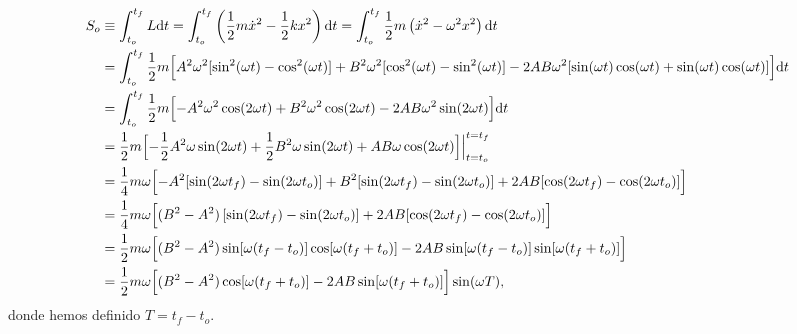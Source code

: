 \documentclass{article}
\begin{document}
\begin{align}
    S_o &\equiv \int_{t_o}^{t_f} L \mathrm{d}t = \int_{t_o}^{t_f} \left(\frac{1}{2}m\dot{x}^2 - \frac{1}{2}kx^2\right) \mathrm{d}t = \int_{t_o}^{t_f} \frac{1}{2}m\left(\dot{x}^2 - \omega^2 x^2\right) \mathrm{d}t \nonumber \\
    &= \int_{t_o}^{t_f} \frac{1}{2}m \Bigl[A^2\omega^2[\sin^2(\omega t)-\cos^2(\omega t)] + B^2\omega^2[\cos^2(\omega t)-\sin^2(\omega t)] - 2AB\omega^2[\sin(\omega t)\cos(\omega t)+\sin(\omega t)\cos(\omega t)]\Bigr] \mathrm{d}t \nonumber \\
    &= \int_{t_o}^{t_f} \frac{1}{2}m \Bigl[-A^2\omega^2\cos(2\omega t) + B^2\omega^2\cos(2\omega t) - 2AB\omega^2\sin(2\omega t)\Bigr] \mathrm{d}t \nonumber \\
    &= \frac{1}{2}m \Bigl[-\frac{1}{2}A^2\omega\sin(2\omega t) + \frac{1}{2}B^2\omega\sin(2\omega t) + AB\omega\cos(2\omega t)\Bigr] \Bigr|_{t=t_o}^{t=t_f} \nonumber \\
    &= \frac{1}{4}m\omega \Bigl[-A^2[\sin(2\omega t_f)-\sin(2\omega t_o)] + B^2[\sin(2\omega t_f)-\sin(2\omega t_o)] + 2AB[\cos(2\omega t_f)-\cos(2\omega t_o)]\Bigr] \nonumber \\
    &= \frac{1}{4}m\omega \Bigl[(B^2-A^2)\,[\sin(2\omega t_f)-\sin(2\omega t_o)] + 2AB[\cos(2\omega t_f)-\cos(2\omega t_o)]\Bigr] \nonumber \\
    &= \frac{1}{2}m\omega \Bigl[(B^2-A^2)\sin[\omega(t_f-t_o)]\cos[\omega(t_f+t_o)] - 2AB\sin[\omega(t_f-t_o)]\sin[\omega(t_f+t_o)]\Bigr] \nonumber \\
    &= \frac{1}{2}m\omega \Bigl[(B^2-A^2)\cos[\omega(t_f+t_o)] - 2AB
    \sin[\omega(t_f+t_o)]\Bigr] \sin(\omega T),
\end{align}
donde hemos definido $T=t_f-t_o$.

\vspace{0.5cm}
\begin{center}
\end{center}  \vspace{0.5cm}
\end{document}
